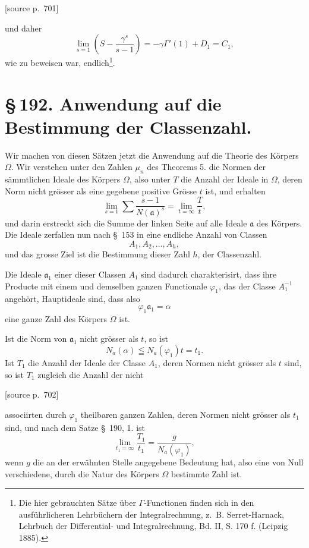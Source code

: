 \documentclass[11pt]{article}
\newcommand{\srcpage}[1]{\par\medskip\noindent\textsf{[source p.~#1]}\par\smallskip}
\begin{document}
\srcpage{701}
und daher
\begin{equation}
\lim_{s=1}\left(S-\frac{\gamma^s}{s-1}\right)
=-\gamma\Gamma'(1)+D_1=C_1,
\tag{20}
\end{equation}
wie zu beweisen war, endlich\footnote{Die hier gebrauchten Sätze über $\Gamma$-Functionen finden sich in den ausführlicheren Lehrbüchern der Integralrechnung, z.\ B. Serret-Harnack, Lehrbuch der Differential- und Integralrechnung, Bd. II, S. 170 f. (Leipzig 1885).}.
\section*{\S\,192. Anwendung auf die Bestimmung der Classenzahl.}

Wir machen von diesen Sätzen jetzt die Anwendung auf die Theorie des Körpers $\Omega$. Wir verstehen unter den Zahlen $\mu_n$ des Theorems 5. die Normen der sämmtlichen Ideale des Körpers $\Omega$, also unter $T$ die Anzahl der Ideale in $\Omega$, deren Norm nicht grösser als eine gegebene positive Grösse $t$ ist, und erhalten
\begin{equation}
\lim_{s=1}\sum\frac{s-1}{N(\mathfrak a)^s}=\lim_{t=\infty}\frac{T}{t},
\tag{1}
\end{equation}
und darin erstreckt sich die Summe der linken Seite auf alle Ideale $\mathfrak a$ des Körpers. Die Ideale zerfallen nun nach \S~153 in eine endliche Anzahl von Classen
\[
A_1,A_2,\ldots,A_h,
\]
und das grosse Ziel ist die Bestimmung dieser Zahl $h$, der Classenzahl.

Die Ideale $\mathfrak a_1$ einer dieser Classen $A_1$ sind dadurch charakterisirt, dass ihre Producte mit einem und demselben ganzen Functionale $\varphi_1$, das der Classe $A_1^{-1}$ angehört, Hauptideale sind, dass also
\[
\varphi_1\mathfrak a_1=\alpha
\]
eine ganze Zahl des Körpers $\Omega$ ist.

Ist die Norm von $\mathfrak a_1$ nicht grösser als $t$, so ist
\[
N_a(\alpha)\leqq N_a(\varphi_1)t=t_1.
\]
Ist $T_1$ die Anzahl der Ideale der Classe $A_1$, deren Normen nicht grösser als $t$ sind, so ist $T_1$ zugleich die Anzahl der nicht

\srcpage{702}
associirten durch $\varphi_1$ theilbaren ganzen Zahlen, deren Normen nicht grösser als $t_1$ sind, und nach dem Satze \S~190, 1. ist
\begin{equation}
\lim_{t_1=\infty}\frac{T_1}{t_1}=\frac{g}{N_a(\varphi_1)},
\tag{2}
\end{equation}
wenn $g$ die an der erwähnten Stelle angegebene Bedeutung hat, also eine von Null verschiedene, durch die Natur des Körpers $\Omega$ bestimmte Zahl ist.
\end{document}

